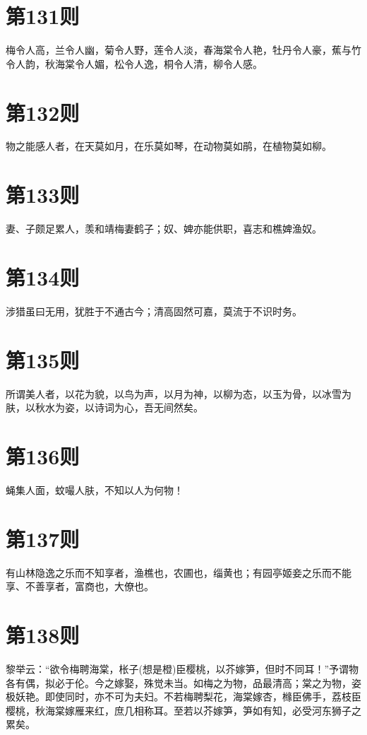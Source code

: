\documentclass[12pt,a4paper]{ctexbook}
\begin{document}
\section{第131则}
梅令人高，兰令人幽，菊令人野，莲令人淡，春海棠令人艳，牡丹令人豪，蕉与竹令人韵，秋海棠令人媚，松令人逸，桐令人清，柳令人感。\par

\section{第132则}
物之能感人者，在天莫如月，在乐莫如琴，在动物莫如鹃，在植物莫如柳。\par

\section{第133则}
妻、子颇足累人，羡和靖梅妻鹤子；奴、婢亦能供职，喜志和樵婢渔奴。\par

\section{第134则}
涉猎虽曰无用，犹胜于不通古今；清高固然可嘉，莫流于不识时务。\par

\section{第135则}
所谓美人者，以花为貌，以鸟为声，以月为神，以柳为态，以玉为骨，以冰雪为肤，以秋水为姿，以诗词为心，吾无间然矣。\par

\section{第136则}
蝇集人面，蚊嘬人肤，不知以人为何物！\par

\section{第137则}
有山林隐逸之乐而不知享者，渔樵也，农圃也，缁黄也；有园亭姬妾之乐而不能享、不善享者，富商也，大僚也。\par

\section{第138则}
黎举云：“欲令梅聘海棠，枨子(想是橙)臣樱桃，以芥嫁笋，但时不同耳！”予谓物各有偶，拟必于伦。今之嫁娶，殊觉未当。如梅之为物，品最清高；棠之为物，姿极妖艳。即使同时，亦不可为夫妇。不若梅聘梨花，海棠嫁杏，橼臣佛手，荔枝臣樱桃，秋海棠嫁雁来红，庶几相称耳。至若以芥嫁笋，笋如有知，必受河东狮子之累矣。\par
\end{document}
